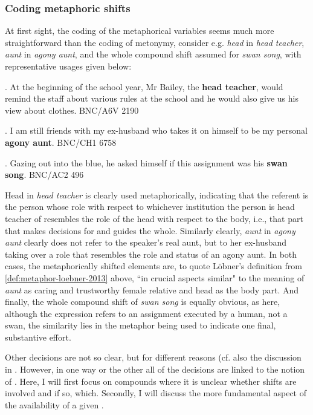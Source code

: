 \subsubsection{Coding metaphoric shifts}
\label{sec:bellschaefer2013-coding-metaphorical}

At first sight, the coding of the metaphorical variables seems much
more straightforward than the coding of metonymy, consider e.g. \emph{head} in \emph{head
  teacher}, \emph{aunt} in \emph{agony aunt}, and the whole compound
shift assumed for \emph{swan song}, with representative usages given
below:

\pagebreak[4]
\ex.  At the beginning of the school year, Mr Bailey, the \textbf{head teacher}, would remind the staff about various rules at the school and he would also give us his view about clothes. BNC/A6V 2190 	

\ex. I am still friends with my ex-husband who takes it on himself to be my personal \textbf{agony aunt}. BNC/CH1 6758 	

\ex. Gazing out into the blue, he asked himself if this assignment was his \textbf{swan song}. BNC/AC2 496 	

Head in \emph{head teacher} is clearly used metaphorically, indicating
that the referent is the person whose role with respect to whichever institution the person is
head teacher of resembles the role of the head with respect to the body, i.e., that part
that makes decisions for and guides the whole. Similarly clearly, \emph{aunt} in \emph{agony aunt}
clearly does not refer to the speaker's real aunt, but to her
ex-husband taking over a role that resembles the role and status of an agony aunt. In both cases, the metaphorically shifted elements are, to quote 
 Löbner's definition from \ref{def:metaphor-loebner-2013} above, ``in crucial aspects
similar" to the meaning of \emph{aunt} as caring and trustworthy female relative and head as the body part.
And finally, the whole
compound shift of \emph{swan song} is equally obvious, as here, although the
expression refers to an assignment executed by a human, not a swan,
the similarity lies in the metaphor being used to indicate one final,
substantive effort.
 
Other decisions are not so clear, but for different reasons (cf. also the discussion in \citet{BellandSchaefer:2016}.
However, in one way or the other all of the decisions are linked to the notion of
. Here, I will first focus on compounds where it is unclear whether
shifts are involved and if so, which. Secondly, I will discuss the more fundamental aspect of the
availability of a given .

